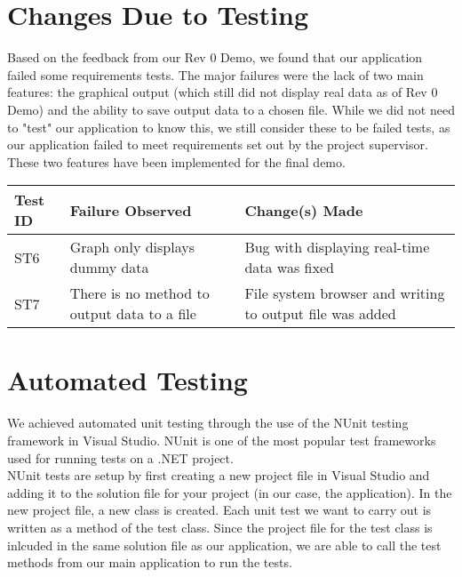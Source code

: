 \documentclass[12pt, titlepage]{article}
\begin{document}
\section{Changes Due to Testing}

\noindent Based on the feedback from our Rev 0 Demo, we found that our application failed some requirements tests. The major failures were the lack of two main features: the graphical output (which still did not display real data as of Rev 0 Demo) and the ability to save output data to a chosen file. While we did not need to "test" our application to know this, we still consider these to be failed tests, as our application failed to meet requirements set out by the project supervisor. These two features have been implemented for the final demo. \\

\begin{tabular}{ |p{3cm}|p{5cm}|p{5cm}| }
  \hline
  \textbf{Test ID} & \textbf{Failure Observed} & \textbf{Change(s) Made} \\
  \hline 
  ST6 & Graph only displays dummy data & Bug with displaying real-time data was fixed \\ \hline
  ST7 & There is no method to output data to a file & File system browser and writing to output file was added \\
  \hline
 \end{tabular}


\section{Automated Testing}

\noindent We achieved automated unit testing through the use of the NUnit testing framework in Visual Studio. NUnit is one of the most popular test frameworks used for running tests on a .NET project.\\

\noindent NUnit tests are setup by first creating a new project file in Visual Studio and adding it to the solution file for your project (in our case, the application). In the new project file, a new class is created. Each unit test we want to carry out is written as a method of the test class. Since the project file for the test class is inlcuded in the same solution file as our application, we are able to call the test methods from our main application to run the tests.\\
		
\end{document}
